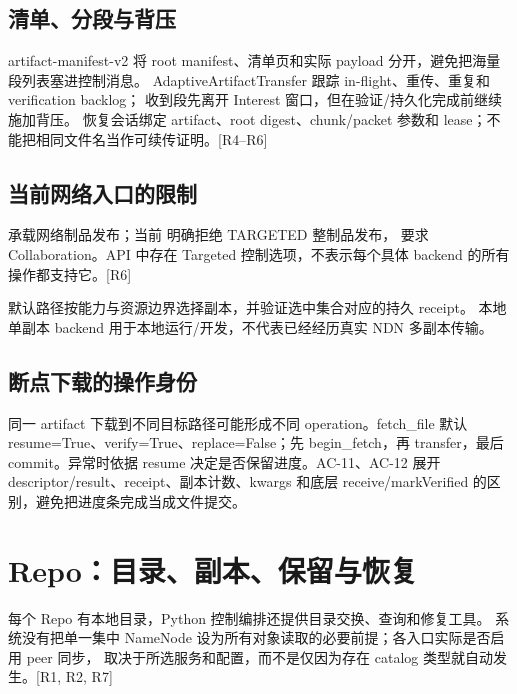 \subsection{清单、分段与背压}
artifact-manifest-v2 将 root manifest、清单页和实际 payload 分开，避免把海量段列表塞进控制消息。
AdaptiveArtifactTransfer 跟踪 in-flight、重传、重复和 verification backlog；
收到段先离开 Interest 窗口，但在验证/持久化完成前继续施加背压。
恢复会话绑定 artifact、root digest、chunk/packet 参数和 lease；不能把相同文件名当作可续传证明。[R4--R6]

\subsection{当前网络入口的限制}
 承载网络制品发布；当前
 明确拒绝 TARGETED 整制品发布，
要求 Collaboration。API 中存在 Targeted 控制选项，不表示每个具体 backend 的所有操作都支持它。[R6]

默认路径按能力与资源边界选择副本，并验证选中集合对应的持久 receipt。
本地单副本 backend 用于本地运行/开发，不代表已经经历真实 NDN 多副本传输。



\subsection{断点下载的操作身份}
同一 artifact 下载到不同目标路径可能形成不同 operation。fetch\_file 默认 resume=True、verify=True、replace=False；先 begin\_fetch，再 transfer，最后 commit。异常时依据 resume 决定是否保留进度。AC-11、AC-12 展开 descriptor/result、receipt、副本计数、kwargs 和底层 receive/markVerified 的区别，避免把进度条完成当成文件提交。

\newpage

\section{Repo：目录、副本、保留与恢复}
每个 Repo 有本地目录，Python 控制编排还提供目录交换、查询和修复工具。
系统没有把单一集中 NameNode 设为所有对象读取的必要前提；各入口实际是否启用 peer 同步，
取决于所选服务和配置，而不是仅因为存在 catalog 类型就自动发生。[R1, R2, R7]

